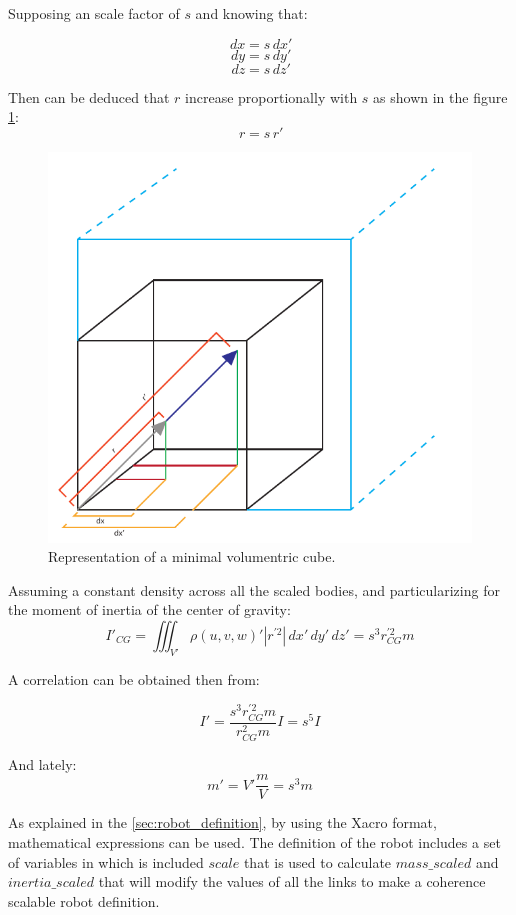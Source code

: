 Supposing an scale factor of $s$ and knowing that:

\begin{multicols}{3}
  \begin{equation}
    \,dx=s \,dx'
  \end{equation}\break
  \begin{equation}
    \,dy=s \,dy'
  \end{equation}\break
  \begin{equation}
    \,dz=s \,dz'
  \end{equation}\break
\end{multicols}

Then can be deduced that $r$ increase proportionally with $s$ as shown in the figure \ref{fig:dimensional_analysis}:
\begin{equation}
  \,r=s \,r'
\end{equation}

\begin{figure}[ht!]
  \centering
  \includegraphics[width=0.5\linewidth]{figures/dimensional_analysis.pdf}
  \caption{Representation of a minimal volumentric cube.}
  \label{fig:dimensional_analysis}
\end{figure}

Assuming a constant density across all the scaled bodies, and particularizing for the moment of inertia of the center of gravity:
\begin{equation}
  I'_{CG} = \iiint_{V'} \rho(u,v,w)' |r^{'2}| \,dx'\,dy'\,dz' = s^{3} r_{CG}^{'2} m
\end{equation}

A correlation can be obtained then from:

\begin{equation}
\label{eq:inertia_scale}
  I' = \frac{s^{3} r_{CG}^{'2} m}{r_{CG}^{2} m} I = s^{5} I
\end{equation}

And lately:
\begin{equation}
\label{eq:mass_scale}
  m' = V' \frac{m}{V} = s^{3}m
\end{equation}

As explained in the \ref{sec:robot_definition}, by using the Xacro format, mathematical expressions can be used.
The definition of the robot includes a set of variables in which is included $scale$ that is used to calculate $mass\_scaled$ and $inertia\_scaled$ that will modify the values of all the links to make a coherence scalable robot definition.

